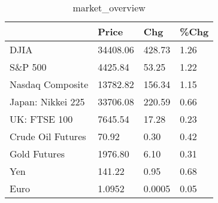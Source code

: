\documentclass{article}%
\begin{document}
%


\begin{table}[htbp]%
\caption{market\_overview}%
\centering%
\begin{adjustbox}{width=1\textwidth}%
\begin{tabular}{llll}
\toprule
                  &    Price &    Chg & \%Chg \\
\midrule
             DJIA & 34408.06 & 428.73 & 1.26 \\
          S\&P 500 &  4425.84 &  53.25 & 1.22 \\
 Nasdaq Composite & 13782.82 & 156.34 & 1.15 \\
Japan: Nikkei 225 & 33706.08 & 220.59 & 0.66 \\
     UK: FTSE 100 &  7645.54 &  17.28 & 0.23 \\
Crude Oil Futures &    70.92 &   0.30 & 0.42 \\
     Gold Futures &  1976.80 &   6.10 & 0.31 \\
              Yen &   141.22 &   0.95 & 0.68 \\
             Euro &   1.0952 & 0.0005 & 0.05 \\
\bottomrule
\end{tabular}
%
\end{adjustbox}%
\end{table}

%
\end{document}
